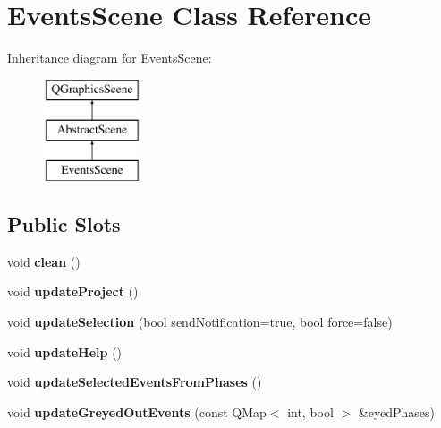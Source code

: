 \hypertarget{class_events_scene}{\section{Events\-Scene Class Reference}
\label{class_events_scene}
}
Inheritance diagram for Events\-Scene\-:\begin{figure}[H]
\begin{center}
\leavevmode
\includegraphics[height=3.000000cm]{class_events_scene}
\end{center}
\end{figure}
\subsection*{Public Slots}
\begin{DoxyCompactItemize}
\item 
\hypertarget{class_events_scene_aeb75b8d40947e5341dee6a82f07574a4}{void {\bfseries clean} ()}\label{class_events_scene_aeb75b8d40947e5341dee6a82f07574a4}

\item 
\hypertarget{class_events_scene_a63d5b371ea66ea6f8cd049971df267ca}{void {\bfseries update\-Project} ()}\label{class_events_scene_a63d5b371ea66ea6f8cd049971df267ca}

\item 
\hypertarget{class_events_scene_a283274aa7a5a9ebfaa818156595cd695}{void {\bfseries update\-Selection} (bool send\-Notification=true, bool force=false)}\label{class_events_scene_a283274aa7a5a9ebfaa818156595cd695}

\item 
\hypertarget{class_events_scene_a5eb58bf55c4fd425f9d5152e03e58918}{void {\bfseries update\-Help} ()}\label{class_events_scene_a5eb58bf55c4fd425f9d5152e03e58918}

\item 
\hypertarget{class_events_scene_aa3215940b71b288383a943d416149399}{void {\bfseries update\-Selected\-Events\-From\-Phases} ()}\label{class_events_scene_aa3215940b71b288383a943d416149399}

\item 
\hypertarget{class_events_scene_a4acdb20f07dfa9a789df1ba78fe118e8}{void {\bfseries update\-Greyed\-Out\-Events} (const Q\-Map$<$ int, bool $>$ \&eyed\-Phases)}\label{class_events_scene_a4acdb20f07dfa9a789df1ba78fe118e8}

\end{DoxyCompactItemize}
